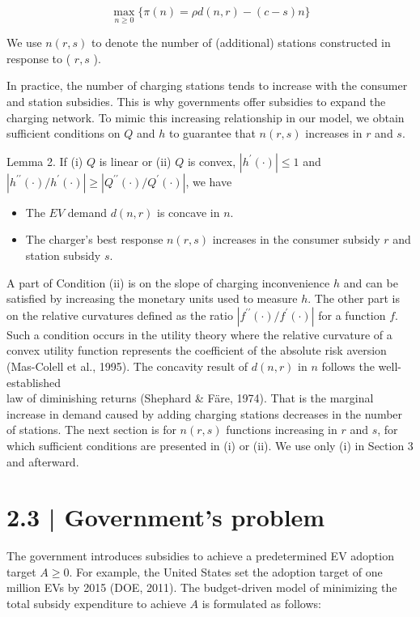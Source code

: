 \documentclass[10pt]{article}
\begin{document}
\begin{equation*}
\max _{n \geq 0}\{\pi(n)=\rho d(n, r)-(c-s) n\} \tag{2}
\end{equation*}


We use $n(r, s)$ to denote the number of (additional) stations constructed in response to ( $r, s$ ).

In practice, the number of charging stations tends to increase with the consumer and station subsidies. This is why governments offer subsidies to expand the charging network. To mimic this increasing relationship in our model, we obtain sufficient conditions on $Q$ and $h$ to guarantee that $n(r, s)$ increases in $r$ and $s$.

Lemma 2. If (i) $Q$ is linear or (ii) $Q$ is convex, $\left|h^{\prime}(\cdot)\right| \leq 1$ and $\left|h^{\prime \prime}(\cdot) / h^{\prime}(\cdot)\right| \geq\left|Q^{\prime \prime}(\cdot) / Q^{\prime}(\cdot)\right|$, we have

\begin{itemize}
  \item The $E V$ demand $d(n, r)$ is concave in $n$.
  \item The charger's best response $n(r, s)$ increases in the consumer subsidy $r$ and station subsidy $s$.
\end{itemize}

A part of Condition (ii) is on the slope of charging inconvenience $h$ and can be satisfied by increasing the monetary units used to measure $h$. The other part is on the relative curvatures defined as the ratio $\left|f^{\prime \prime}(\cdot) / f^{\prime}(\cdot)\right|$ for a function $f$. Such a condition occurs in the utility theory where the relative curvature of a convex utility function represents the coefficient of the absolute risk aversion (Mas-Colell et al., 1995). The concavity result of $d(n, r)$ in $n$ follows the well-established\\
law of diminishing returns (Shephard \& Färe, 1974). That is the marginal increase in demand caused by adding charging stations decreases in the number of stations. The next section is for $n(r, s)$ functions increasing in $r$ and $s$, for which sufficient conditions are presented in (i) or (ii). We use only (i) in Section 3 and afterward.

\section*{2.3 | Government's problem}
The government introduces subsidies to achieve a predetermined EV adoption target $A \geq 0$. For example, the United States set the adoption target of one million EVs by 2015 (DOE, 2011). The budget-driven model of minimizing the total subsidy expenditure to achieve $A$ is formulated as follows:
\end{document}
